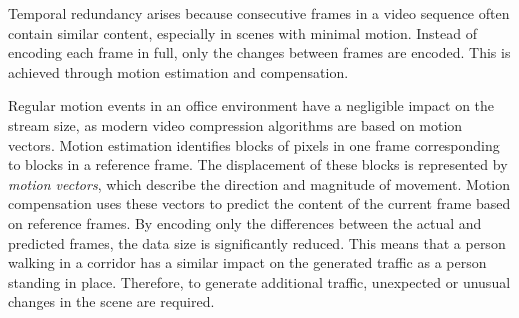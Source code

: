 Temporal redundancy arises because consecutive frames in a video sequence often contain similar content, especially in scenes with minimal motion. Instead of encoding each frame in full, only the changes between frames are encoded. This is achieved through motion estimation and compensation.

Regular motion events in an office environment have a negligible impact on the stream size, as modern video compression algorithms are based on motion vectors. 
Motion estimation identifies blocks of pixels in one frame corresponding to blocks in a reference frame. The displacement of these blocks is represented by \textit{motion vectors}, which describe the direction and magnitude of movement. Motion compensation uses these vectors to predict the content of the current frame based on reference frames. By encoding only the differences between the actual and predicted frames, the data size is significantly reduced.
This means that a person walking in a corridor has a similar impact on the generated traffic as a person standing in place. 
Therefore, to generate additional traffic, unexpected or unusual changes in the scene are required. 




